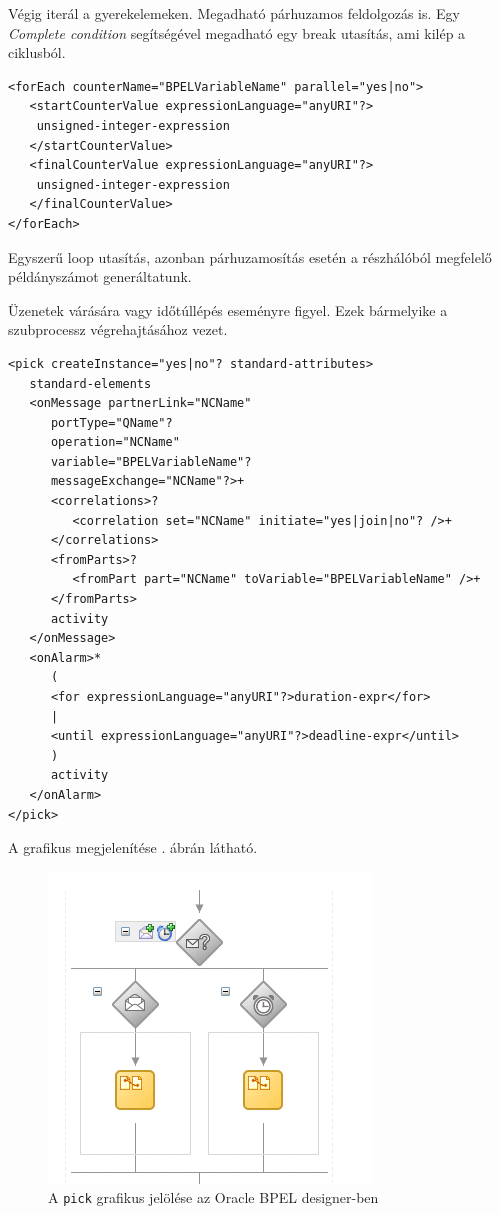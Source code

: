 Végig iterál a gyerekelemeken. Megadható párhuzamos feldolgozás is. Egy \textit{Complete condition} segítségével megadható egy break utasítás, ami kilép a ciklusból. 
\begin{verbatim}
<forEach counterName="BPELVariableName" parallel="yes|no">
   <startCounterValue expressionLanguage="anyURI"?>
  	unsigned-integer-expression
   </startCounterValue>
   <finalCounterValue expressionLanguage="anyURI"?>
  	unsigned-integer-expression
   </finalCounterValue>
</forEach>
\end{verbatim}
Egyszerű loop utasítás, azonban párhuzamosítás esetén a részhálóból megfelelő példányszámot generáltatunk. 

Üzenetek várására vagy időtúllépés eseményre figyel. Ezek bármelyike a szubprocessz végrehajtásához vezet. 
\begin{verbatim}
<pick createInstance="yes|no"? standard-attributes>
   standard-elements
   <onMessage partnerLink="NCName"
      portType="QName"?
      operation="NCName"
      variable="BPELVariableName"?
      messageExchange="NCName"?>+
      <correlations>?
         <correlation set="NCName" initiate="yes|join|no"? />+
      </correlations>
      <fromParts>?
         <fromPart part="NCName" toVariable="BPELVariableName" />+
      </fromParts>
      activity
   </onMessage>
   <onAlarm>*
      (
      <for expressionLanguage="anyURI"?>duration-expr</for>
      |
      <until expressionLanguage="anyURI"?>deadline-expr</until>
      )
      activity
   </onAlarm>
</pick>
\end{verbatim}
A grafikus megjelenítése . ábrán látható.

\begin{figure}[h!]
\centering
\includegraphics[scale=1]{images/pick.png}
\caption{A \texttt{pick} grafikus jelölése az Oracle BPEL designer-ben}
\label{fig:pick}
\end{figure}

